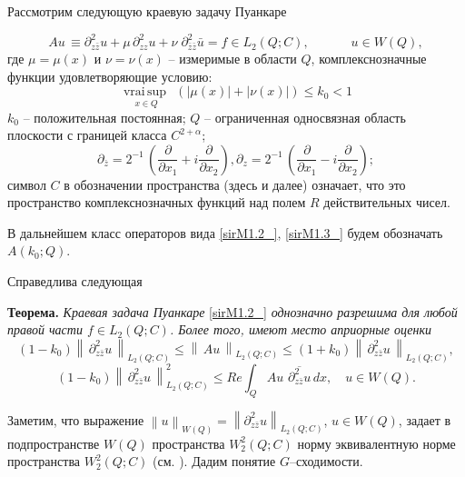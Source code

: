 Рассмотрим следующую краевую задачу Пуанкаре

\begin{equation} \label{sirM1.2_} Au\, \equiv \partial _{z\bar{z}}^{2} u+\mu \, \partial _{zz}^{2} u+\nu \; \partial _{\bar{z}\bar{z}}^{2} \bar{u}=f\in L_{2} (Q;C),\quad \; \quad \quad u\in W(Q), \end{equation}
где  $\mu =\mu (x)$ и  $\nu =\nu (x)$ --  измеримые в области  $Q$,  комплекснозначные функции удовлетворяющие условию:
\begin{equation} \label{sirM1.3_} \mathop{\mathrm{ vrai}\, \sup }\limits_{\, \, x\in Q} \; \, \left(|\mu (x)|+|\nu (x)|\right)\le k_{0} <1 \end{equation}
$k_{0} $ -- положительная постоянная; $Q$ -- ограниченная односвязная область плоскости с границей класса $C^{2+\alpha } $;
\begin{equation*}
\partial _{\bar{z}} =2^{-1} \, \left(\frac{\partial }{\partial x_{1} } +i\frac{\partial }{\partial x_{2} } \right),      \partial _{z} =2^{-1} \, \left(\frac{\partial }{\partial x_{1} } -i\frac{\partial }{\partial x_{2} } \right);
\end{equation*}
символ $C$ в обозначении пространства (здесь и далее) означает, что это пространство комплекснозначных функций над полем $R$ действительных чисел.

В дальнейшем класс операторов вида \eqref{sirM1.2_}, \eqref{sirM1.3_} будем обозначать $A(k_{0} ;Q)$.

Справедлива следующая \cite{Jamaludinova}

\textbf{Теорема. }\textit{Краевая задача Пуанкаре }\eqref{sirM1.2_} \textit{однозначно разрешима для любой правой части $f\in L_{2} (Q;C)$. Более того, имеют место априорные оценки}
\begin{equation}
\label{sirM1.4_}
(1-k_{0} )\left\| \, \partial _{z\bar{z}}^{2} u\, \right\| _{L_{2} (Q;C)} \le \left\| \, Au\, \right\| _{L_{2} (Q;C)} \le (1+k_{0} )\left\| \, \partial _{z\bar{z}}^{2} u\, \right\| _{L_{2} (Q;C)},
\end{equation}
\begin{equation}\label{sirM1.5_}
(1-k_{0} )\left\| \, \partial _{z\bar{z}}^{2} u\, \right\| ^{2} _{L_{2} (Q;C)} \le Re\int _{Q}Au\, \, \overline{\partial _{z\bar{z}}^{2} u} \, dx,\quad u\in W(Q).
\end{equation}

Заметим, что выражение $\left\| u\right\| _{W(Q)} =\left\| \partial _{z\bar{z}}^{2} u\right\| _{L_{2} (Q;C)} $, $u\in W(Q)$, задает в подпространстве $W(Q)$ пространства $W_{2}^{2} (Q;C)$ норму эквивалентную норме пространства $W_{2}^{2} (Q;C)$ (см. \cite{Jamaludinova}). 
Дадим понятие $G$--сходимости.

